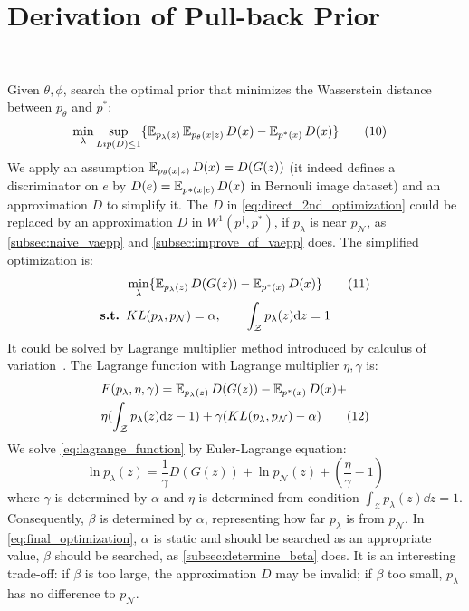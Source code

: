 \section{Derivation of Pull-back Prior}~\label{subsec:inference}

Given $\theta, \phi$, search the optimal prior that minimizes the Wasserstein distance between $p_\theta$ and $p^*$:
\begin{align*}\label{eq:direct_2nd_optimization}
	& \min_{\lambda} \sup_{Lip(D) \leq 1} \{\operatorname{\mathbb{E}}_{p_\lambda(z)} \operatorname{\mathbb{E}}_{p_\theta(x|z)} D(x)  - \operatorname{\mathbb{E}}_{p^*(x)} D(x)\} 
	\tag{10}
\end{align*}
We apply an assumption $\operatorname{\mathbb{E}}_{p_\theta(x|z)} D(x) = D(G(z))$ (it indeed defines a discriminator on $e$ by $D(e) = \operatorname{\mathbb{E}}_{p*(x|e)} D(x)$ in Bernouli image dataset) and an approximation $D$ to simplify it. The $D$ in \cref{eq:direct_2nd_optimization} could be replaced by an approximation $D$ in $W^1(p^\dag, p^*)$, if $p_\lambda$ is near $p_\mathcal{N}$, as \cref{subsec:naive_vaepp} and \cref{subsec:improve_of_vaepp} does. The simplified optimization is:
\begin{align*}\label{eq:final_optimization}
	& \min_{\lambda} \{\operatorname{\mathbb{E}}_{p_\lambda(z)} D(G(z))  - \operatorname{\mathbb{E}}_{p^*(x)} D(x)\} \tag{11} \\
	{\textbf{s.t. }} & KL(p_\lambda, p_\mathcal{N}) = \alpha, \qquad \int_{\mathcal{Z}} p_\lambda(z) \mathrm{d} z = 1
\end{align*}
It could be solved by Lagrange multiplier method introduced by calculus of variation~\cite{gelfand2000calculus}. The Lagrange function with Lagrange multiplier $\eta, \gamma$ is:
\begin{align*}\label{eq:lagrange_function}
& F(p_\lambda, \eta, \gamma) = \operatorname{\mathbb{E}}_{p_\lambda(z)} D(G(z))  - \operatorname{\mathbb{E}}_{p^*(x)} D(x) + \\
& \eta (\int_{\mathcal{Z}} p_\lambda(z) \mathrm{d} z - 1) + \gamma(KL(p_\lambda, p_\mathcal{N}) - \alpha) \tag{12}
\end{align*}
We solve \cref{eq:lagrange_function} by Euler-Lagrange equation:
\begin{equation*}\label{eq:euler_lagrange_eqaution}
	\ln p_\lambda(z) = \frac{1}{\gamma} D(G(z)) + \ln p_\mathcal{N}(z) + (\frac{\eta}{\gamma} - 1) \tag{13}
\end{equation*}
where $\gamma$ is determined by $\alpha$ and $\eta$ is determined from condition $\int_{\mathcal{Z}} p_\lambda(z) \dd z = 1$.
Consequently, $\beta$ is determined by $\alpha$, representing how far $p_\lambda$ is from $p_\mathcal{N}$. In \cref{eq:final_optimization}, $\alpha$ is static and should be searched as an appropriate value, \IE $\beta$ should be searched, as \cref{subsec:determine_beta} does. It is an interesting trade-off: if $\beta$ is too large, the approximation $D$ may be invalid; if $\beta$ too small, $p_\lambda$ has no difference to $p_\mathcal{N}$. 
 
 